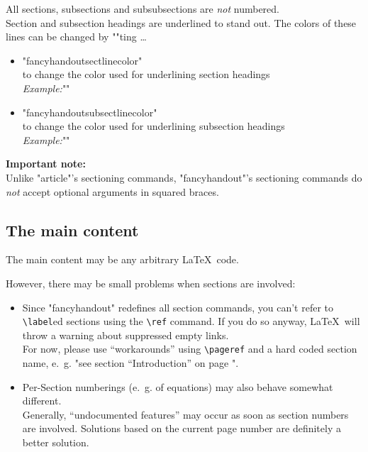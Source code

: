 \documentclass[11pt]{ltxdoc}
\begin{document}
	\medskip
	All sections, subsections and subsubsections are \emph{not} numbered. \\
	Section and subsection headings are underlined to stand out. The colors of these lines can be changed by ""ting …
	\begin{itemize}
		\item "fancyhandoutsectlinecolor" \\
			to change the color used for underlining section headings \\[\smallskipamount]
			\textit{Example:}\quad ""
		
		\item "fancyhandoutsubsectlinecolor" \\
			to change the color used for underlining subsection headings \\[\smallskipamount]
			\textit{Example:}\quad ""
	\end{itemize}
	
	\medskip
	\textbf{Important note:} \\
	Unlike "article"'s sectioning commands, "fancyhandout"'s sectioning commands do \emph{not} accept optional arguments in squared braces.
	
	
	\subsection{The main content}
	The main content may be any arbitrary \LaTeX\ code.
	
	\bigskip
	However, there may be small problems when sections are involved:
	\begin{itemize}
		\item
			Since "fancyhandout" redefines all section commands, you can't refer to \verb|\label|ed sections using the \verb|\ref| command.
			If you do so anyway, \LaTeX\ will throw a warning about suppressed empty links. \\
			For now, please use \enquote{workarounds} using \verb|\pageref| and a hard coded section name, e.~g. "see section “Introduction” on page \pageref{intro}".
		
		\item
			Per-Section numberings (e.~g. of equations) may also behave somewhat different. \\
			Generally, \enquote{undocumented features} may occur as soon as section numbers are involved. Solutions based on the current page number are definitely a better solution.
	\end{itemize}
	
\end{document}
